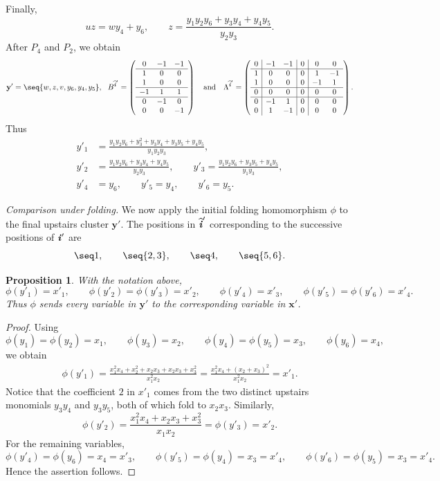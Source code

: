 \documentclass[12pt, leqno]{amsart}
\numberwithin{equation}{section}
\theoremstyle{plain}
\newtheorem{proposition}[lemma]{Proposition}
\theoremstyle{definition}
\newcommand{\ii}{ \textbf{\textit{i}}}
\newcommand{\hii}{{\widehat{\ii}}}
\newcommand{\bfx}{\mathbf{x}}
\newcommand{\bfy}{\mathbf{y}}
\newcommand{\qtq}[1][{and}]{\quad\text{{#1}}\quad}
\begin{document}
Finally,
\[
uz=wy_4+y_6,
\qquad
z=
\frac{y_1y_2y_6+y_3y_4+y_4y_5}{y_2y_3}.
\]
After $P_4$ and $P_2$, we obtain
\[
\bfy'=\seq{w,z,v,y_6,y_4,y_5},
\ \
B^{\hii'} =
\left(
\begin{array}{ccc}
0&-1&-1\\ \hline
1&0&0\\
1&0&0\\ \hline
-1&1&1\\ \hline
0&-1&0\\
0&0&-1
\end{array}
\right)
\qtq
\Lambda^{\hii'}
=
\left(
\begin{array}{c|cc|c|cc}
0&-1&-1&0&0&0\\ \hline
1&0&0&0&1&-1\\
1&0&0&0&-1&1\\ \hline
0&0&0&0&0&0\\ \hline
0&-1&1&0&0&0\\
0&1&-1&0&0&0
\end{array}
\right).
\]
Thus
\[
\begin{aligned}
y'_1&= \frac{y_1y_2y_6+y_3^2+y_3y_4+y_3y_5+y_4y_5}{y_1y_2y_3},\\
y'_2&= \frac{y_1y_2y_6+y_3y_4+y_4y_5}{y_2y_3},
\qquad
y'_3= \frac{y_1y_2y_6+y_3y_5+y_4y_5}{y_1y_3},\\
y'_4&=y_6,\qquad y'_5=y_4,\qquad y'_6=y_5.
\end{aligned}
\]

\smallskip
\noindent\emph{Comparison under folding.}
We now apply the initial folding homomorphism $\phi$ to  the final upstairs cluster $\bfy'$. The positions in $\hii'$ corresponding to the successive positions of $\ii'$ are
\[
\seq1,\qquad \seq{2,3},\qquad \seq4,\qquad \seq{5,6}.
\]

\begin{proposition}\label{prop: motivating C2 variable folding}
With the notation above,
\[
\phi(y'_1)=x'_1,\qquad \phi(y'_2)=\phi(y'_3)=x'_2,\qquad \phi(y'_4)=x'_3,\qquad  \phi(y'_5)=\phi(y'_6)=x'_4.
\]
 Thus $\phi$ sends every variable in $\bfy'$ to the corresponding variable in $\bfx'$.
\end{proposition}

\begin{proof}
Using
\[
\phi(y_1)=\phi(y_2)=x_1,\qquad \phi(y_3)=x_2,\qquad  \phi(y_4)=\phi(y_5)=x_3,\qquad \phi(y_6)=x_4,
\]
we obtain
\begin{align*}
\phi(y'_1) = \frac{x_1^2x_4+x_2^2+x_2x_3+x_2x_3+x_3^2}{x_1^2x_2}
= \frac{x_1^2x_4+(x_2+x_3)^2}{x_1^2x_2} =x'_1.
\end{align*}
Notice that the coefficient $2$ in $x'_1$ comes from the two distinct
upstairs monomials $y_3y_4$ and $y_3y_5$, both of which fold to
$x_2x_3$.
Similarly,
\[
\phi(y'_2) = \frac{x_1^2x_4+x_2x_3+x_3^2}{x_1x_2} = \phi(y'_3) = x'_2.
\]
For the remaining variables,
\[
\phi(y'_4)=\phi(y_6)=x_4=x'_3, \qquad \phi(y'_5)=\phi(y_4)=x_3=x'_4, \qquad \phi(y'_6)=\phi(y_5)=x_3=x'_4.
\]
Hence the assertion follows.
\end{proof}
\end{document}
